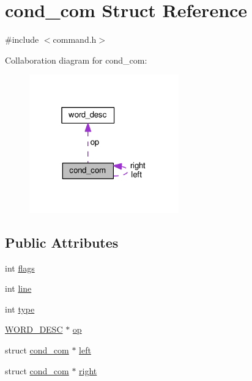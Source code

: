 \hypertarget{structcond__com}{}\section{cond\+\_\+com Struct Reference}
\label{structcond__com}


{\ttfamily \#include $<$command.\+h$>$}



Collaboration diagram for cond\+\_\+com\+:
\nopagebreak
\begin{figure}[H]
\begin{center}
\leavevmode
\includegraphics[width=183pt]{structcond__com__coll__graph}
\end{center}
\end{figure}
\subsection*{Public Attributes}
\begin{DoxyCompactItemize}
\item 
int \hyperlink{structcond__com_abe64315eec13089b3dc43c54acb5e6d0}{flags}
\item 
int \hyperlink{structcond__com_a7a36bcce3ca4c65e93c44648091a9a84}{line}
\item 
int \hyperlink{structcond__com_a664011494f9f9386279500a5d9f8674a}{type}
\item 
\hyperlink{command_8h_a3f0cccf333703e5f6c4168be0db675fa}{W\+O\+R\+D\+\_\+\+D\+E\+SC} $\ast$ \hyperlink{structcond__com_a3778220cc80ac673817cb33f796b9484}{op}
\item 
struct \hyperlink{structcond__com}{cond\+\_\+com} $\ast$ \hyperlink{structcond__com_a96d0c77c1c43455170008963a48f1711}{left}
\item 
struct \hyperlink{structcond__com}{cond\+\_\+com} $\ast$ \hyperlink{structcond__com_ad3879e315749f6f1bd363592c2dd9416}{right}
\end{DoxyCompactItemize}


